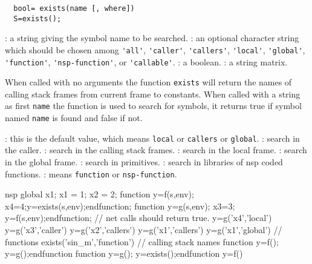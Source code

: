 \begin{mandesc}
\end{mandesc}
\begin{calling_sequence}
\begin{verbatim}
  bool= exists(name [, where])
  S=exists();
\end{verbatim}
\end{calling_sequence}
\begin{parameters}
  \begin{varlist}
    : a string giving the symbol name to be searched.
    : an optional character string which should be chosen 
    among \verb+'all'+, \verb+'caller'+, \verb+'callers'+, \verb+'local'+,
    \verb+'global'+, \verb+'function'+, \verb+'nsp-function'+, or 
    \verb+'callable'+.
    : a boolean. 
    : a string matrix.
  \end{varlist}
\end{parameters}
\begin{mandescription}
  When called with no arguments the function \verb+exists+ will return 
  the names of calling stack frames from current frame to constants. 
  When called with a string as first \verb+name+ the function is 
  used to search for symbols, it returns true if 
  symbol named \verb+name+ is found and false if not. 
  \begin{varlist}
    : this is the default value, which  means \verb+local+ or 
    \verb+callers+ or \verb+global+.
    :  search in the caller. 
    : search in the calling stack frames.
    : search in the local frame.
    : search in the global frame.
    : search in primitives. 
    : search in libraries of nsp coded functions.
    : means \verb+function+ or \verb+nsp-function+.
  \end{varlist}
\end{mandescription}
\begin{examples}
  \begin{mintednsp}{nsp}
    global x1;
    x1 = 1;
    x2 = 2;
    function y=f(s,env); x4=4;y=exists(s,env);endfunction;
    function y=g(s,env); x3=3; y=f(s,env);endfunction;
    // net calls should return true.
    y=g('x4','local')
    y=g('x3','caller')
    y=g('x2','callers')
    y=g('x1','callers')
    y=g('x1','global')
    // functions 
    exists('sin_m','function')
    // calling stack names 
    function y=f(); y=g();endfunction 
    function y=g(); y=exists();endfunction 
    y=f()
  \end{mintednsp}
\end{examples}
\begin{manseealso}
\end{manseealso}
